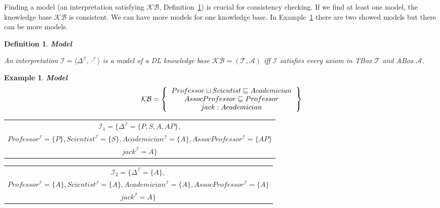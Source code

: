\documentclass[12pt,a4paper]{article}
\newtheorem{definition}{Definition}[subsection]
\newtheorem{example}{Example}[subsection]
\begin{document}
Finding a model (an interpretation satisfying $\mathcal{KB}$, Definition~\ref{def:model}) is crucial for consistency checking. If we find at least one model, the knowledge base $\mathcal{KB}$ is consistent. We can have more models for one knowledge base. In Example~\ref{example:model} there are two showed models but there can be more models. 

\begin{definition}{\textbf{Model}}
	\label{def:model}

	An interpretation $\mathcal{I} = \langle \Delta^{\mathcal{I}}, \cdot ^{\mathcal{I}}  \rangle$ is a model of a DL knowledge base $\mathcal{KB} = (\mathcal{T}, \mathcal{A})$ iff $\mathcal{I}$ satisfies every axiom in TBox $\mathcal{T}$ and ABox $\mathcal{A}$.
\end{definition}

\begin{example}{\textbf{Model}}
	\label{example:model}
	\[ 
	\mathcal{KB} = \left\{
	\begin{tabular}{c c}
	$Professor \sqcup Scientist \sqsubseteq Academician$ \\
	$AssocProfessor \sqsubseteq Professor$ \\
	$jack : Academician$ \\
	\end{tabular}
	\right \}
	\]

	\begin{table}[H]
		\centering
		\begin{tabular}{c}
			$ \mathcal{I}_{1} = \{  \Delta^{\mathcal{I}} = \{ P,S,A,AP \}, $ \\
			\addlinespace[0.4cm]
			$ Professor^{\mathcal{I}} = \{P\}, Scientist^{\mathcal{I}} = \{S\}, Academician^{\mathcal{I}} = \{A\}, AssocProfessor^{\mathcal{I}} = \{AP\} $ \\
			\addlinespace[0.4cm]
			$ jack^{\mathcal{I}} = A \} $
		\end{tabular}
	\end{table}
		
	\begin{table}[H]
		\centering
		\begin{tabular}{c}
			$ \mathcal{I}_{2} = \{  \Delta^{\mathcal{I}} = \{ A \}, $ \\
			\addlinespace[0.4cm]
			$ Professor^{\mathcal{I}} = \{A\}, Scientist^{\mathcal{I}} = \{A\}, Academician^{\mathcal{I}} = \{A\}, AssocProfessor^{\mathcal{I}} = \{A\} $ \\
			\addlinespace[0.4cm]
			$ jack^{\mathcal{I}} = A \} $
		\end{tabular}
	\end{table}

\end{example}
\end{document}
